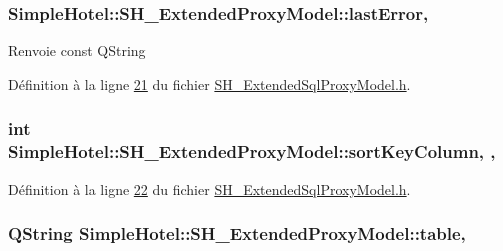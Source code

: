 \hypertarget{classSimpleHotel_1_1SH__ExtendedProxyModel_a8b5c74b23d91bde591eba6d32a20c30f}{
\subsubsection[{last\-Error}]{\setlength{\rightskip}{0pt plus 5cm}Simple\-Hotel\-::\-S\-H\-\_\-\-Extended\-Proxy\-Model\-::last\-Error\hspace{0.3cm}{\ttfamily [read]}, {\ttfamily [inherited]}}}\label{classSimpleHotel_1_1SH__ExtendedProxyModel_a8b5c74b23d91bde591eba6d32a20c30f}
\begin{DoxyReturn}{Renvoie}
const Q\-String 
\end{DoxyReturn}


Définition à la ligne \hyperlink{SH__ExtendedSqlProxyModel_8h_source_l00021}{21} du fichier \hyperlink{SH__ExtendedSqlProxyModel_8h_source}{S\-H\-\_\-\-Extended\-Sql\-Proxy\-Model.\-h}.

\hypertarget{classSimpleHotel_1_1SH__ExtendedProxyModel_a879989e7ae305dc2794b281c5e0ab689}{
\subsubsection[{sort\-Key\-Column}]{\setlength{\rightskip}{0pt plus 5cm}int Simple\-Hotel\-::\-S\-H\-\_\-\-Extended\-Proxy\-Model\-::sort\-Key\-Column\hspace{0.3cm}{\ttfamily [read]}, {\ttfamily [write]}, {\ttfamily [inherited]}}}\label{classSimpleHotel_1_1SH__ExtendedProxyModel_a879989e7ae305dc2794b281c5e0ab689}


Définition à la ligne \hyperlink{SH__ExtendedSqlProxyModel_8h_source_l00022}{22} du fichier \hyperlink{SH__ExtendedSqlProxyModel_8h_source}{S\-H\-\_\-\-Extended\-Sql\-Proxy\-Model.\-h}.

\hypertarget{classSimpleHotel_1_1SH__ExtendedProxyModel_a98cd3050230163561b4dac11a9675b8e}{
\subsubsection[{table}]{\setlength{\rightskip}{0pt plus 5cm}Q\-String Simple\-Hotel\-::\-S\-H\-\_\-\-Extended\-Proxy\-Model\-::table\hspace{0.3cm}{\ttfamily [read]}, {\ttfamily [inherited]}}}\label{classSimpleHotel_1_1SH__ExtendedProxyModel_a98cd3050230163561b4dac11a9675b8e}


